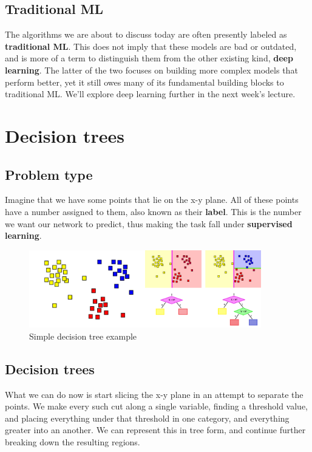 \documentclass{article}
\begin{document}
\subsection{Traditional ML}
The algorithms we are about to discuss today are often presently labeled as \textbf{traditional ML}. This does not imply that these models are bad or outdated, and is more of a term to distinguish them from the other existing kind, \textbf{deep learning}. The latter of the two focuses on building more complex models that perform better, yet it still owes many of its fundamental building blocks to traditional ML. We'll explore deep learning further in the next week's lecture.

\section{Decision trees}
\subsection{Problem type}
Imagine that we have some points that lie on the x-y plane. All of these points have a number assigned to them, also known as their \textbf{label}. This is the number we want our network to predict, thus making the task fall under \textbf{supervised learning}.
\begin{figure}[!htb]
    \begin{center}
        \includegraphics[width=0.9\textwidth]{combined.png}
    \end{center}
    \vspace{-10pt}
    \caption{Simple decision tree example}
\end{figure}
\subsection{Decision trees}
What we can do now is start slicing the x-y plane in an attempt to separate the points. We make every such cut along a single variable, finding a threshold value, and placing everything under that threshold in one category, and everything greater into an another. We can represent this in tree form, and continue further breaking down the resulting regions.
\end{document}
